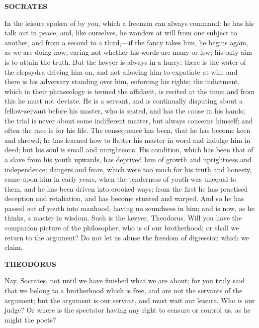 \documentclass[11pt,letter]{article}
\begin{document}
\par \textbf{SOCRATES}
\par   In the leisure spoken of by you, which a freeman can always command:  he has his talk out in peace, and, like ourselves, he wanders at will from one subject to another, and from a second to a third,—if the fancy takes him, he begins again, as we are doing now, caring not whether his words are many or few; his only aim is to attain the truth. But the lawyer is always in a hurry; there is the water of the clepsydra driving him on, and not allowing him to expatiate at will:  and there is his adversary standing over him, enforcing his rights; the indictment, which in their phraseology is termed the affidavit, is recited at the time:  and from this he must not deviate. He is a servant, and is continually disputing about a fellow-servant before his master, who is seated, and has the cause in his hands; the trial is never about some indifferent matter, but always concerns himself; and often the race is for his life. The consequence has been, that he has become keen and shrewd; he has learned how to flatter his master in word and indulge him in deed; but his soul is small and unrighteous. His condition, which has been that of a slave from his youth upwards, has deprived him of growth and uprightness and independence; dangers and fears, which were too much for his truth and honesty, came upon him in early years, when the tenderness of youth was unequal to them, and he has been driven into crooked ways; from the first he has practised deception and retaliation, and has become stunted and warped. And so he has passed out of youth into manhood, having no soundness in him; and is now, as he thinks, a master in wisdom. Such is the lawyer, Theodorus. Will you have the companion picture of the philosopher, who is of our brotherhood; or shall we return to the argument? Do not let us abuse the freedom of digression which we claim.

\par \textbf{THEODORUS}
\par   Nay, Socrates, not until we have finished what we are about; for you truly said that we belong to a brotherhood which is free, and are not the servants of the argument; but the argument is our servant, and must wait our leisure. Who is our judge? Or where is the spectator having any right to censure or control us, as he might the poets?
\end{document}

